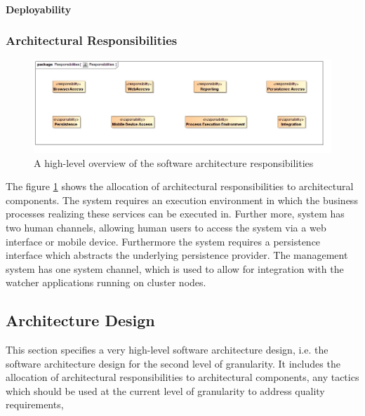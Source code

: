 \paragraph{Deployability}
\label{sec:systemDeployability}

\subsubsection{Architectural Responsibilities}
\begin{figure}[H]
	\begin{center}
	\includegraphics[scale=0.5]{../Diagrams and Charts/Architecture/Responsibilities.jpg}
	\caption{A high-level overview of the software architecture responsibilities}
	\end{center}
	\label{fig:architectureResponsibilities}
\end{figure}

The figure \ref{fig:architectureResponsibilities} shows the allocation of architectural
responsibilities to architectural components. The system requires an execution environment
in which the business processes realizing these services can be executed in. Further more,
system has two human channels, allowing human users to access the system via a  web interface
or mobile device. Furthermore the system requires a persistence interface which abstracts the
underlying persistence provider. The management system has one system channel, which is used
to allow for integration with the watcher applications running on cluster nodes.


\subsection{Architecture Design}
This section specifies a very high-level software architecture design, i.e.
the software architecture design for the second level of granularity. It
includes the allocation of architectural responsibilities to architectural
components, any tactics which should be used at the current level of
granularity to address quality requirements,

